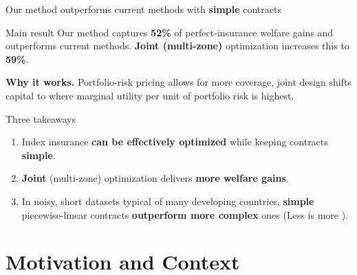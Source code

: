 \documentclass{beamer}
\newcommand{\progressbar}[2]{%
  \begin{tikzpicture}[x=0.9cm,y=0.28cm]
    \foreach \i in {1,...,#1} {
      \pgfmathparse{(\i<=#2)? "vmxbrand":"gray!40"}
      \edef\BarColor{\pgfmathresult}
      \fill[\BarColor] (\i-1,0) rectangle (\i,0.42);
      \draw[black, line width=0.15mm] (\i-1,0) rectangle (\i,0.42);
    }
  \end{tikzpicture}%
}
\newcommand{\sectionframe}[3]{%
  \begin{frame}[plain]
    \vspace{0.4cm}
    \progressbar{#1}{#2}
    \vfill
    \centering
    {\LARGE \bfseries #3\par}
    \vfill
  \end{frame}
}
\begin{document}
\begin{frame}{Our method outperforms current methods with \textbf{simple} contracts}
  \small
  
  \begin{block}{Main result}
  Our method captures \textbf{52\%} of perfect-insurance welfare gains and outperforms current methods. 
  \textbf{Joint (multi-zone)} optimization increases this to \textbf{59\%}.
  \end{block}
  
  \vspace{0.2em}
  \textbf{Why it works.} Portfolio-risk pricing allows for more coverage, joint design shifts capital to where marginal utility per unit of portfolio risk is highest.
  
  \vspace{0.4em}
  \begin{block}{Three takeaways}
  \begin{enumerate}\itemsep1pt
    \item Index insurance \textbf{can be effectively optimized} while keeping contracts \textbf{simple}.
    \item \textbf{Joint} (multi-zone) optimization delivers \textbf{more welfare gains}.
    \item In noisy, short datasets typical of many developing countries, \textbf{simple} piecewise-linear contracts \textbf{outperform more complex} ones (Less is more \cite{xie2024vc}).
  \end{enumerate}
  \end{block}
  
  \end{frame}






\section{Motivation and Context}
\end{document}
